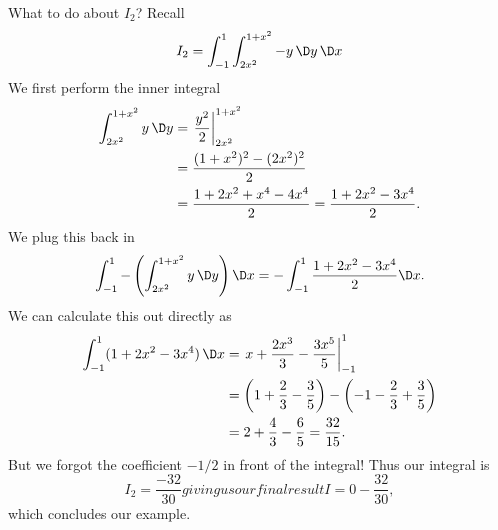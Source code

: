 \begin{example}
What to do about $I_{2}$? Recall
\begin{equation*}
I_{2}= \int^{1}_{-1}\int^{1+x^{2}}_{2x^{2}}-y\,\D y\,\D x
\end{equation*}
We first perform the inner integral
\begin{equation}
\begin{aligned}
\int^{1+x^{2}}_{2x^{2}}y\,\D y &= \left.\frac{y^{2}}{2}\right|^{1+x^{2}}_{2x^{2}}\\
&=\frac{(1+x^{2})^{2} - (2x^{2})^{2}}{2}\\
&=\frac{1+2x^{2}+x^{4}-4x^{4}}{2} = \frac{1+2x^{2}-3x^{4}}{2}.
\end{aligned}
\end{equation}
We plug this back in
\begin{equation}
\int^{1}_{-1}-\left(\int^{1+x^{2}}_{2x^{2}}y\,\D y\right)\D x
=-\int^{1}_{-1}\frac{1+2x^{2}-3x^{4}}{2}\D x.
\end{equation}
We can calculate this out directly as
\begin{equation}
\begin{aligned}
\int^{1}_{-1}(1+2x^{2}-3x^{4})\,\D x
&=\left.x+\frac{2x^{3}}{3}-\frac{3x^{5}}{5}\right|^{1}_{-1}\\
&=\left(1+\frac{2}{3}-\frac{3}{5}\right)-\left(-1-\frac{2}{3}+\frac{3}{5}\right)\\
&=2+\frac{4}{3}-\frac{6}{5}=\frac{32}{15}.
\end{aligned}
\end{equation}
But we forgot the coefficient $-1/2$ in front of the integral!
Thus our integral is 
\begin{subequations}
\begin{equation}
I_{2}=\frac{-32}{30}
\end{equation}
giving us our final result
\begin{equation}
I = 0 - \frac{32}{30},
\end{equation}
\end{subequations}
which concludes our example.
\end{example}
